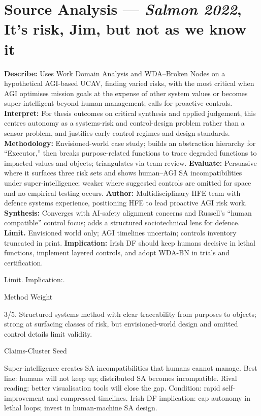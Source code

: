 \section*{Source Analysis — \textit{Salmon 2022}, It’s risk, Jim, but not as we know it}
\textbf{Describe:} Uses Work Domain Analysis and WDA–Broken Nodes on a hypothetical AGI-based UCAV, finding varied risks, with the most critical when AGI optimises mission goals at the expense of other system values or becomes super-intelligent beyond human management; calls for proactive controls.
\textbf{Interpret:} For thesis outcomes on critical synthesis and applied judgement, this centres autonomy as a systems-risk and control-design problem rather than a sensor problem, and justifies early control regimes and design standards.
\textbf{Methodology:} Envisioned-world case study; builds an abstraction hierarchy for “Executor,” then breaks purpose-related functions to trace degraded functions to impacted values and objects; triangulates via team review.
\textbf{Evaluate:} Persuasive where it surfaces three risk sets and shows human–AGI SA incompatibilities under super-intelligence; weaker where suggested controls are omitted for space and no empirical testing occurs.
\textbf{Author:} Multidisciplinary HFE team with defence systems experience, positioning HFE to lead proactive AGI risk work.
\textbf{Synthesis:} Converges with AI-safety alignment concerns and Russell’s “human compatible” control focus; adds a structured sociotechnical lens for defence.
\textbf{Limit.} Envisioned world only; AGI timelines uncertain; controls inventory truncated in print.
\textbf{Implication:} Irish DF should keep humans decisive in lethal functions, implement layered controls, and adopt WDA-BN in trials and certification.

Limit. Implication:.

Method Weight

3/5. Structured systems method with clear traceability from purposes to objects; strong at surfacing classes of risk, but envisioned-world design and omitted control details limit validity.

Claims-Cluster Seed

Super-intelligence creates SA incompatibilities that humans cannot manage.
Best line: humans will not keep up; distributed SA becomes incompatible.
Rival reading: better visualisation tools will close the gap.
Condition: rapid self-improvement and compressed timelines.
Irish DF implication: cap autonomy in lethal loops; invest in human-machine SA design.

